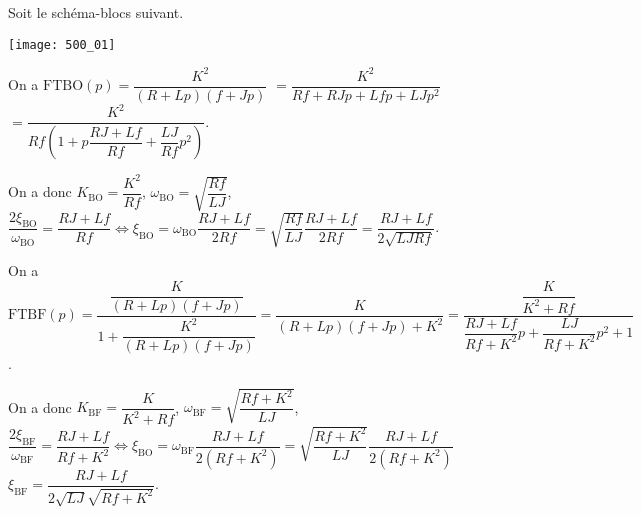 \normaltrue \difficilefalse \tdifficilefalse
\correctiontrue


\setcounter{question}{0}%

\ifcorrection
\else
{}
\fi


\ifprof 
\else
Soit le schéma-blocs suivant.
\begin{marginfigure}
\texttt{[image: 500\_01]}
\end{marginfigure}
 \fi
 
\ifprof
On a $\text{FTBO}(p)=\dfrac{K^2}{\left(R+Lp\right)\left(f+Jp\right)}$
$=\dfrac{K^2}{Rf+RJp+Lfp+LJp^2}$
$=\dfrac{K^2}{Rf\left(1+p\dfrac{RJ+Lf}{Rf}+\dfrac{LJ}{Rf}p^2\right)}$.

On a donc $K_{\text{BO}}=\dfrac{K^2}{Rf}$, 
$\omega_{\text{BO}} = \sqrt{\dfrac{Rf}{LJ}}$,
$\dfrac{2\xi_{\text{BO}} }{\omega_{\text{BO}}}=\dfrac{RJ+Lf}{Rf} \Leftrightarrow
\xi_{\text{BO}} =\omega_{\text{BO}}\dfrac{RJ+Lf}{2Rf}
=\sqrt{\dfrac{Rf}{LJ}}\dfrac{RJ+Lf}{2Rf}
=\dfrac{RJ+Lf}{2\sqrt{LJRf}}$.
\else 
\fi

\ifprof
On a $\text{FTBF}(p)=\dfrac{\dfrac{K}{\left(R+Lp\right)\left(f+Jp\right)}}{1+\dfrac{K^2}{\left(R+Lp\right)\left(f+Jp\right)}}
=\dfrac{K}{\left(R+Lp\right)\left(f+Jp\right)+K^2}
=\dfrac{\dfrac{K}{K^2+Rf}}{\dfrac{RJ+Lf}{Rf+K^2}p+\dfrac{LJ}{Rf+K^2}p^2+1}$.



On a donc $K_{\text{BF}}=\dfrac{K}{K^2+Rf}$, 
$\omega_{\text{BF}} = \sqrt{\dfrac{Rf+K^2}{LJ}}$,
$\dfrac{2\xi_{\text{BF}} }{\omega_{\text{BF}}}=\dfrac{RJ+Lf}{Rf+K^2} \Leftrightarrow
\xi_{\text{BO}} =\omega_{\text{BF}}\dfrac{RJ+Lf}{2\left(Rf+K^2\right)}
=\sqrt{\dfrac{Rf+K^2}{LJ}}\dfrac{RJ+Lf}{2\left(Rf+K^2\right)}$
%
$\xi_{\text{BF}}=\dfrac{RJ+Lf}{2\sqrt{LJ}\sqrt{Rf+K^2}}$.
\else 
\fi

